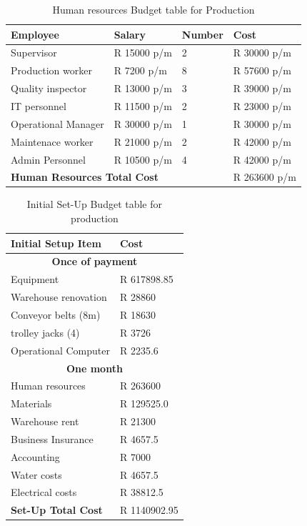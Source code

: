 \documentclass{article}
\begin{document}
  \begin{table}[H] \Large
    \caption{Human resources Budget table for Production}
    \begin{tabular}{|l|l|l|l|} \hline
      \textbf{Employee} & \textbf{Salary} & \textbf{Number} & \textbf{Cost} \\
      \hline
      Supervisor          & R 15000 p/m & 2 & R 30000 p/m \\ \hline 
      Production worker   & R 7200  p/m & 8 & R 57600 p/m \\ \hline
      Quality inspector   & R 13000 p/m & 3 & R 39000 p/m \\ \hline 
      IT personnel        & R 11500 p/m & 2 & R 23000 p/m \\ \hline 
      Operational Manager & R 30000 p/m & 1 & R 30000 p/m \\ \hline 
      Maintenace worker   & R 21000 p/m & 2 & R 42000 p/m \\ \hline
      Admin Personnel     & R 10500 p/m & 4 & R 42000 p/m \\ \hline 
      \multicolumn{3}{|l|}{\textbf{Human Resources Total Cost}} & R 263600 p/m \\ \hline 
    \end{tabular}
  \end{table}
  \Large
  \begin{table}[H] \Large
    \caption{Initial Set-Up Budget table for production}
    \begin{tabular}{|l|l|} \hline
      \textbf{Initial Setup Item} & \textbf{Cost} \\ \hline
      \multicolumn{2}{|c|}{\textbf{Once of payment}} \\ \hline
      Equipment           & R 617898.85 \\ \hline
      Warehouse renovation& R 28860     \\ \hline 
      Conveyor belts (8m) & R 18630     \\ \hline 
      trolley jacks (4)    & R 3726      \\ \hline 
      Operational Computer& R 2235.6    \\ \hline
      \multicolumn{2}{|c|}{\textbf{One month}} \\ \hline
      Human resources     & R 263600    \\ \hline
      Materials           & R 129525.0  \\ \hline 
      Warehouse rent      & R 21300     \\ \hline
      Business Insurance  & R 4657.5    \\ \hline 
      Accounting          & R 7000      \\ \hline
      Water costs         & R 4657.5    \\ \hline
      Electrical costs    & R 38812.5   \\ \hline
      \textbf{Set-Up Total Cost} & R 1140902.95 \\ \hline 
    \end{tabular}
  \end{table}
\end{document}
